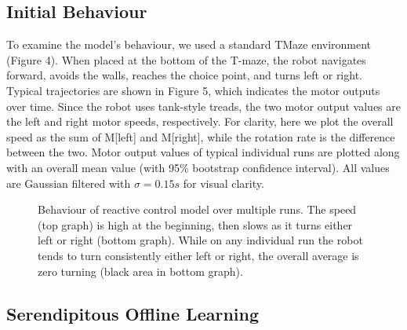 \documentclass[conference]{IEEEtran}
\begin{document}
\subsection{Initial Behaviour}

To examine the model's behaviour, we used a standard TMaze
environment (Figure 4). When placed at the bottom
of the T-maze, the robot navigates forward, avoids the
walls, reaches the choice point, and turns left or right.
Typical trajectories are shown in Figure 5, which indicates
the motor outputs over time. Since the robot uses tank-style
treads, the two motor output values are the left and right
motor speeds, respectively. For clarity, here we plot the
overall speed as the sum of M[left] and M[right], while
the rotation rate is the difference between the two. Motor output values of typical individual runs are plotted along
with an overall mean value (with 95\% bootstrap confidence
interval). All values are Gaussian filtered with $\sigma=0.15s$ for visual clarity.

\begin{figure}[!t]
\label{Cnt}
\centering
\caption{Behaviour of reactive control model over multiple runs. The speed (top graph) is high at the beginning, then slows as it turns either left or right (bottom graph). While on any individual run the robot tends to turn consistently either left or right, the overall average is zero turning (black
area in bottom graph).}
\end{figure}

\subsection{Serendipitous Offline Learning}
\end{document}
